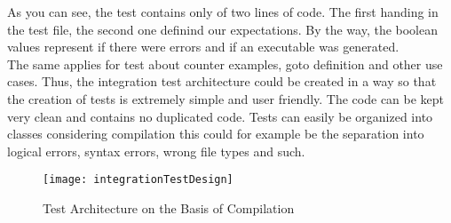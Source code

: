 As you can see, the test contains only of two lines of code. The first handing in the test file, the second one definind our expectations. By the way, the boolean values represent if there were errors and if an executable was generated.\\
The same applies for test about counter examples, goto definition and other use cases. Thus, the integration test architecture could be created in a way so that the creation of tests is extremely simple and user friendly. The code can be kept very clean and contains no duplicated code. Tests can easily be organized into classes \textendash{} considering compilation this could for example be the separation into logical errors, syntax errors, wrong file types and such.

\begin{figure}[h]
    \centering
    \texttt{[image: integrationTestDesign]}
    \caption{Test Architecture on the Basis of Compilation}
    \label{fig:testArchitecture}
\end{figure}
